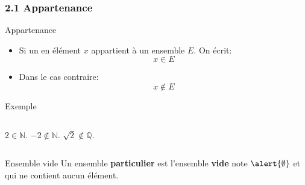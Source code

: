 \documentclass{beamer}
\begin{document}
\begin{frame}[<+->]
  \frametitle{2.1 Appartenance}
  
  \begin{block}{Appartenance}
    \scriptsize
    \begin{itemize}
      \item 
   Si un en élément $x$ appartient à un ensemble $E$. On écrit:
   \begin{equation}
     x \in E
   \end{equation}
 \item Dans le cas contraire:
   \begin{equation}
     x \not\in E
   \end{equation}
 \end{itemize}
  \end{block}
  \begin{block}{Exemple}
   \scriptsize 
   \begin{columns}
      $ 2 \in \mathbb{N}$.
     $ -2 \not\in \mathbb{N}$.
     $ \sqrt{2} \notin \mathbb{Q}$.
  \end{columns}
  \end{block}

  \begin{block}{Ensemble vide}
    \scriptsize
    Un ensemble \textbf{particulier}  est l'ensemble \textbf{\alert{vide}} note
    $\alert{\mathbf{\emptyset}}$ et qui ne contient aucun élément.
    
  \end{block}
\end{frame}
\end{document}
